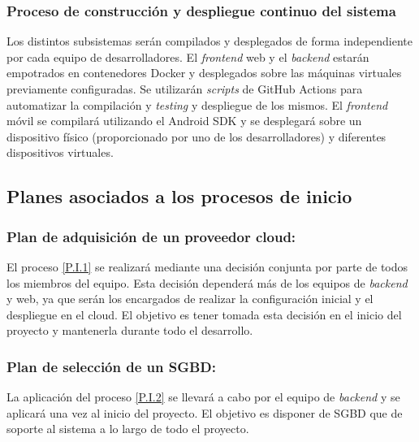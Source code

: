 \documentclass{article}
\begin{document}
\subsubsection{Proceso de construcción y despliegue continuo del sistema} \label{P.T.6}
Los distintos subsistemas serán compilados y desplegados de forma independiente por cada equipo de desarrolladores.
El \textit{frontend} web y el \textit{backend} estarán empotrados en contenedores Docker y desplegados sobre las máquinas virtuales previamente configuradas. Se utilizarán \textit{scripts} de GitHub Actions para automatizar la compilación y \textit{testing} y despliegue de los mismos. El \textit{frontend} móvil se compilará utilizando el Android SDK y se desplegará sobre un dispositivo físico (proporcionado por uno de los desarrolladores) y diferentes dispositivos virtuales.

\pagebreak


\subsection{Planes asociados a los procesos de inicio}

\subsubsection{Plan de adquisición de un proveedor cloud:} \label{PL.I.1}

El proceso \ref{P.I.1} se realizará mediante una decisión conjunta por parte de todos los miembros del equipo. Esta decisión dependerá más de los equipos de \textit{backend} y web, ya que serán los encargados de realizar la configuración inicial y el despliegue en el cloud. El objetivo es tener tomada esta decisión en el inicio del proyecto y mantenerla durante todo el desarrollo.
 
\subsubsection{Plan de selección de un SGBD:}  \label{PL.I.2}

La aplicación del proceso \ref{P.I.2} se llevará a cabo por el equipo de \textit{backend} y se aplicará una vez al inicio del proyecto. El objetivo es disponer de SGBD que de soporte al sistema a lo largo de todo el proyecto.
\end{document}
